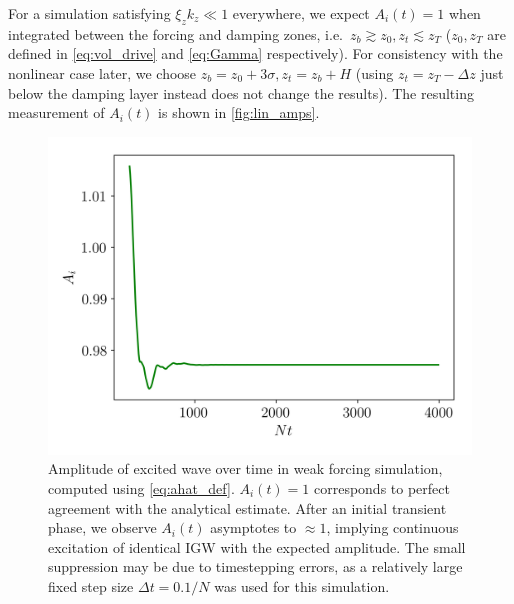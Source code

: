 \documentclass[
        fleqn,
        usenatbib,
        referee,
    ]{mnras}
\begin{document}
For a simulation satisfying $\xi_z k_z \ll 1$ everywhere, we expect
$A_i(t) = 1$ when integrated between the forcing and damping zones, i.e.\
$z_b \gtrsim z_0, z_t \lesssim z_T$ ($z_0, z_T$ are defined in
\autoref{eq:vol_drive} and \autoref{eq:Gamma} respectively). For consistency
with the nonlinear case later, we choose $z_b = z_0 + 3\sigma, z_t = z_b + H$
(using $z_t = z_T - \Delta z$ just below the damping layer instead does not
change the results). The resulting measurement of $A_i(t)$ is shown in
\autoref{fig:lin_amps}.
\begin{figure}
    \centering
    \includegraphics[width=\columnwidth]{plots/lin_amps.png}
    \caption{Amplitude of excited wave over time in weak forcing simulation,
    computed using \autoref{eq:ahat_def}. $A_i(t) = 1$ corresponds to
    perfect agreement with the analytical estimate. After an initial transient
    phase, we observe $A_i(t)$ asymptotes to $\approx 1$, implying continuous
    excitation of identical IGW with the expected amplitude. The small
    suppression may be due to timestepping errors, as a relatively large fixed
    step size $\Delta t = 0.1/N$ was used for this
    simulation.}\label{fig:lin_amps}
\end{figure}
\end{document}
